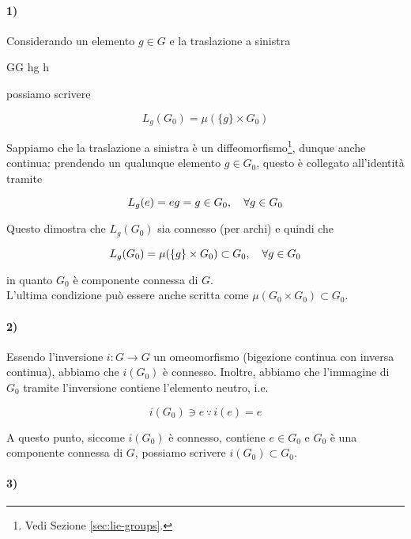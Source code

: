 {
\paragraph{1)}

Considerando un elemento $ g \in G $ e la traslazione a sinistra

	{G}{G}
	{h}{g h}

possiamo scrivere

\begin{equation}
	L_{g}(G_{0}) = \mu(\{g\} \times G_{0})
\end{equation}

Sappiamo che la traslazione a sinistra è un diffeomorfismo\footnote{%
	Vedi Sezione \ref{sec:lie-groups}.%
}, dunque anche continua: prendendo un qualunque elemento $ g \in G_{0} $, questo è collegato all'identità tramite

\begin{equation}
	L_{g}(e) = e g = g \in G_{0} \qcomma \forall g \in G_{0}
\end{equation}

Questo dimostra che $ L_{g}(G_{0}) $ sia connesso (per archi) e quindi che

\begin{equation}
	L_{g}(G_{0}) = \mu(\{g\} \times G_{0}) \subset G_{0} \qcomma \forall g \in G_{0}
\end{equation}

in quanto $ G_{0} $ è componente connessa di $ G $. \\
L'ultima condizione può essere anche scritta come $ \mu(G_{0} \times G_{0}) \subset G_{0} $.

\paragraph{2)}

Essendo l'inversione $ i : G \to G $ un omeomorfismo (bigezione continua con inversa continua), abbiamo che $ i(G_{0}) $ è connesso. Inoltre, abbiamo che l'immagine di $ G_{0} $ tramite l'inversione contiene l'elemento neutro, i.e.

\begin{equation}
	i(G_{0}) \ni e \, \because \, i(e) = e
\end{equation}

A questo punto, siccome $ i(G_{0}) $ è connesso, contiene $ e \in G_{0} $ e $ G_{0} $ è una componente connessa di $ G $, possiamo scrivere $ i(G_{0}) \subset G_{0} $.

\paragraph{3)}

}
